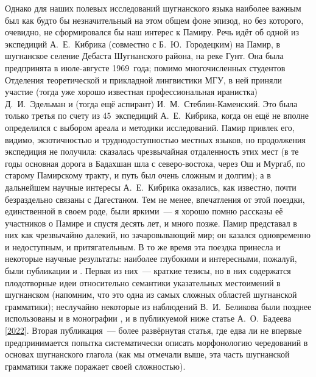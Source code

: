 Однако для наших полевых исследований шугнанского языка наиболее важным был как будто бы незначительный на этом общем  фоне эпизод, но без которого, очевидно, не сформировался бы наш интерес к Памиру. Речь идёт об одной из экспедиций А.~Е.~Кибрика (совместно с Б.~Ю.~Городецким) на Памир, в шугнанское селение Дебаста Шугнанского района, на реке Гунт. Она была предпринята в июле-августе 1969~года; помимо многочисленных студентов Отделения теоретической и прикладной лингвистики МГУ, в ней приняли участие (тогда уже хорошо известная профессиональная иранистка) Д.~И.~Эдельман и (тогда ещё аспирант) И.~М.~Стеблин-Каменский. Это была только третья по счету из 45~экспедиций А.~Е.~Кибрика, когда он ещё не вполне определился с выбором ареала и методики исследований. Памир привлек его, видимо, экзотичностью и труднодоступностью местных языков, но продолжения экспедиция не получила: сказалась чрезвычайная отдаленность этих мест (в те годы основная дорога в Бадахшан шла с северо-востока, через Ош и Мургаб, по старому Памирскому тракту, и путь был очень сложным и долгим); а в дальнейшем научные интересы А.~Е.~Кибрика оказались, как известно, почти безраздельно связаны с Дагестаном. Тем не менее, впечатления от этой поездки, единственной в своем роде, были яркими~— я хорошо помню рассказы её участников о Памире и спустя десять лет, и много позже. Памир представал в них как чрезвычайно далекий, но зачаровывающий мир; он казался одновременно и недоступным, и притягательным. В то же время эта поездка принесла и некоторые научные результаты: наиболее глубокими и интересными, пожалуй, были публикации \parencite{belikov1972} и \parencite{muravieva1975}. Первая из них~— краткие тезисы, но в них содержатся плодотворные идеи относительно семантики указательных местоимений в шугнанском (напомним, что это одна из самых сложных областей шугнанской грамматики); неслучайно некоторые из наблюдений В.~И.~Беликова были позднее использованы и в монографии \parencite{yusufbekov1998}, и в публикуемой ниже статье А.~О.~Бадеева [\hyperref[chapter-badeev-demon]{2022}]. Вторая публикация~— более развёрнутая статья, где едва ли не впервые предпринимается попытка систематически описать морфонологию чередований в основах шугнанского глагола (как мы отмечали выше, эта часть шугнанской грамматики также поражает своей сложностью).

